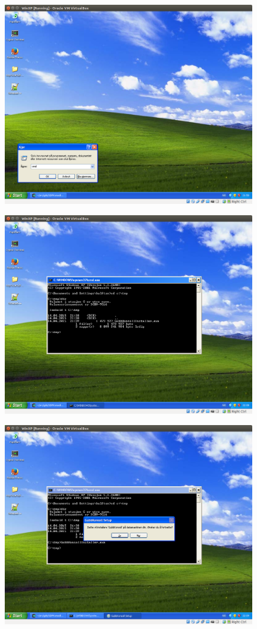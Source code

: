 \documentclass[12pt]{book}
\begin{document}
\includegraphics[width=11cm]{003}

\includegraphics[width=11cm]{004}

\includegraphics[width=11cm]{005}
\end{document}
